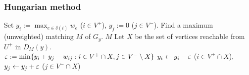 \documentclass[14pt,aspectratio=169,xcolor=dvipsnames,table,onlytextwidth]{beamer}
\begin{document}
\begin{frame}
    \frametitle{Hungarian method}

    \small
    \begin{block}{}
        \begin{algorithmic}[1]
            \STATE Set $y_i := \max_{e \in \delta(i)} w_e$ ($i \in V^+$), $y_j := 0$ ($j \in V^-$).
                \STATE Find a maximum (unweighted) matching $M$ of $G_y$.
                    \RETURN $M$
                    \STATE Let $X$ be the set of vertices reachable from $U^+$ in $D_M(y)$. \\
                    \STATE $\varepsilon := \min\{ y_i + y_j - w_{ij} : i \in V^+ \cap X, j \in V^- \setminus X \}$
                    \STATE $y_i \gets y_i - \varepsilon$ ($i \in V^+ \cap X$), $y_j \gets y_j + \varepsilon$ ($j \in V^- \cap X$)
                \ENDIF
            \ENDWHILE
        \end{algorithmic}
    \end{block}
\end{frame}
\end{document}
